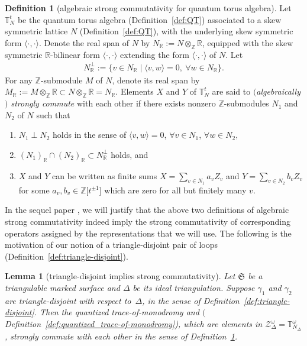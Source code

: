 \documentclass[pdftex]{sigma}
\numberwithin{equation}{section}
\newtheorem{Lemma}[Theorem]{Lemma}
\theoremstyle{definition}
\newtheorem{Definition}[Theorem]{Definition}
\begin{document}
\begin{Definition}[algebraic strong commutativity for quantum torus algebra]
\label{def:algebraic_SC2}
Let $\mathbb{T}^t_N$ be the quantum torus algebra (Definition~\ref{def:QT}) associated to a skew symmetric lattice $N$ (Definition~\ref{def:QT}), with the underlying skew symmetric form $\langle \cdot,\cdot \rangle$.
Denote the real span of $N$ by $N_\mathbb{R} := N \otimes_\mathbb{Z} \mathbb{R}$, equipped with the skew symmetric $\mathbb{R}$-bilinear form $\langle \cdot, \cdot\rangle$ extending the form $\langle \cdot,\cdot\rangle$ of $N$. Let
\begin{align}
\label{eq:N_R_perp}
N_\mathbb{R}^\perp := \{ v\in N_\mathbb{R} \mid \langle v,w\rangle=0, ~ \forall w\in N_\mathbb{R}\}.
\end{align}
For any $\mathbb{Z}$-submodule $M$ of $N$, denote its real span by $M_\mathbb{R} := M \otimes_\mathbb{Z} \mathbb{R} \subset N \otimes_\mathbb{Z} \mathbb{R} = N_\mathbb{R}$.
Elements $X$ and $Y$ of $\mathbb{T}^t_N$ are said to {\em $($algebraically$)$ strongly commute} with each other if there exists nonzero $\mathbb{Z}$-submodules $N_1$ and $N_2$ of $N$ such that
\begin{enumerate}[label={\rm (SC\arabic*)}]\itemsep=0pt\setlength{\leftskip}{0.22cm}
\item\label{SC1} $N_1 \perp N_2$ holds in the sense of
$\langle v,w\rangle=0$, $\forall v\in N_1$, $\forall w\in N_2,$
\item\label{SC2}
$(N_1)_\mathbb{R} \cap (N_2)_\mathbb{R} \subset N_\mathbb{R}^\perp$ holds, and
\item\label{SC3} $X$ and $Y$ can be written as finite sums $X = \sum_{v\in N_1} a_v Z_v$ and $Y = \sum_{v \in N_2} b_v Z_v$ for some $a_v,b_v \in \mathbb{Z}\bigl[t^{\pm 1}\bigr]$ which are zero for all but finitely many $v$.
\end{enumerate}
\end{Definition}
In the sequel paper \cite{sequel}, we will justify that the above two definitions of algebraic strong commutativity indeed imply the strong commutativity of corresponding operators assigned by the representations that we will use.
The following is the motivation of our notion of a triangle-disjoint pair of loops (Definition~\ref{def:triangle-disjoint}).
\begin{Lemma}[triangle-disjoint implies strong commutativity]
\label{lem:triangle-disjoint_implies_strong_commutativity}
Let $\mathfrak{S}$ be a triangulable marked surface and $\Delta$ be its ideal triangulation. Suppose $\gamma_1$ and $\gamma_2$ are triangle-disjoint with respect to~$\Delta$, in the sense of Definition~{\rm \ref{def:triangle-disjoint}}. Then the quantized trace-of-monodromy  and  $($Definition~{\rm \ref{def:quantized_trace-of-monodromy})}, which are elements in $\mathcal{Z}^\omega_\Delta = \mathbb{T}^\omega_{N_\Delta}$, strongly commute with each other in the sense of Definition~{\rm \ref{def:algebraic_SC2}}.
\end{Lemma}
\end{document}
